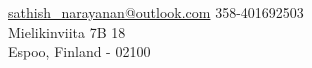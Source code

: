 
\nobreakvspace{0.3em}  %


\noindent\href{mailto:sathish_narayanan@outlook.com}{sathish\_narayanan\mbox{}@\mbox{}outlook.com}\sbull
\textsmaller{+}358-401692503
\\
Mielikinviita 7B 18
\\
Espoo, Finland - 02100 
